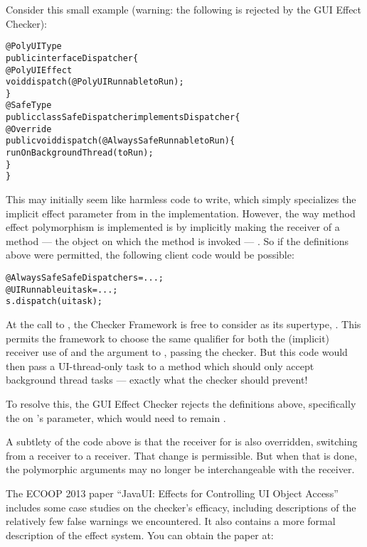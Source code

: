 Consider this small example (warning: the following is rejected by the GUI Effect Checker):

\begin{alltt}
@PolyUIType
public interface Dispatcher \{
    @PolyUIEffect
    void dispatch(@PolyUI Runnable toRun);
\}
@SafeType
public class SafeDispatcher implements Dispatcher \{
    @Override
    public void dispatch(@AlwaysSafe Runnable toRun) \{
        runOnBackgroundThread(toRun);
    \}
\}
\end{alltt}

This may initially seem like harmless code to write, which simply specializes the implicit effect
parameter from  in the  implementation.  However, the way
method effect polymorphism is implemented is by implicitly making the receiver of a
 method --- the object on which the method is invoked --- .  So
if the definitions above were permitted, the following client code would be possible:

\begin{alltt}
@AlwaysSafe SafeDispatcher s = ...;
@UI Runnable uitask = ...;
s.dispatch(uitask);
\end{alltt}

At the call to , the Checker Framework is free to consider  as its
supertype, .  This permits the framework to choose the same qualifier for
both the (implicit) receiver use of  and the  argument to
, passing the checker.  But this code would then pass a UI-thread-only
task to a method which should only accept background thread tasks --- exactly what the checker
should prevent!

To resolve this, the GUI Effect Checker rejects the definitions above, specifically the
 on 's parameter, which would need to remain
.

A subtlety of the code above is that the receiver for  is also
overridden, switching from a  receiver to a  receiver.  That change is
permissible.  But when that is done, the polymorphic arguments may no longer be interchangeable
with the receiver.



The ECOOP 2013 paper ``JavaUI: Effects for Controlling UI Object Access''
    includes some case
    studies on the checker's efficacy, including descriptions of the relatively few false warnings
    we encountered.
    It also contains a more formal description of the effect system.
    You can obtain the paper at: \\


